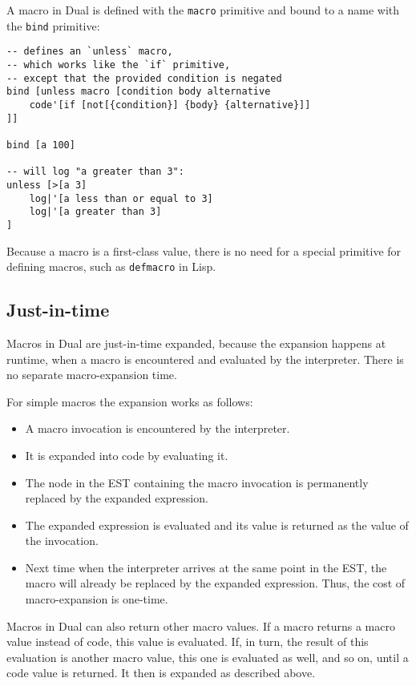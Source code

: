 A macro in Dual is defined with the \texttt{macro} primitive and bound to a name with the \texttt{bind} primitive:
\begin{lstlisting}
-- defines an `unless` macro,
-- which works like the `if` primitive,
-- except that the provided condition is negated
bind [unless macro [condition body alternative
    code'[if [not[{condition}] {body} {alternative}]]
]]

bind [a 100]

-- will log "a greater than 3":
unless [>[a 3]
    log|'[a less than or equal to 3]
    log|'[a greater than 3]
]
\end{lstlisting}

Because a macro is a first-class value, there is no need for a special primitive for defining macros, such as \texttt{defmacro} in Lisp\cite[Section~3.8, Macro DEFMACRO]{common_lisp_hyperspec}.

\subsection{Just-in-time}
Macros in Dual are just-in-time expanded, because the expansion happens at runtime, when a macro is encountered and evaluated by the interpreter. There is no separate macro-expansion time.

For simple macros the expansion works as follows:
\begin{itemize}
    \item A macro invocation is encountered by the interpreter.
    \item It is expanded into code by evaluating it.
    \item The node in the EST containing the macro invocation is permanently replaced by the expanded expression.
    \item The expanded expression is evaluated and its value is returned as the value of the invocation.
    \item Next time when the interpreter arrives at the same point in the EST, the macro will already be replaced by the expanded expression. Thus, the cost of macro-expansion is one-time.
\end{itemize}

Macros in Dual can also return other macro values. If a macro returns a macro value instead of code, this value is evaluated. If, in turn, the result of this evaluation is another macro value, this one is evaluated as well, and so on, until a code value is returned. It then is expanded as described above.

